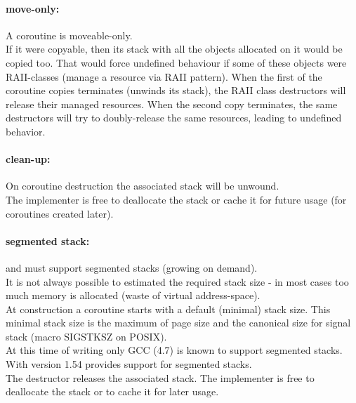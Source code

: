 \paragraph*{move-only:}
A coroutine is moveable-only.\\
\newline
If it were copyable, then its stack with all the objects allocated on it
would be copied too. That would force undefined behaviour if some of these objects
were RAII-classes (manage a resource via RAII pattern). When the first of the
coroutine copies terminates (unwinds its stack), the RAII class destructors will
release their managed resources. When the second copy terminates, the same
destructors will try to doubly-release the same resources, leading to undefined
behavior.

\paragraph*{clean-up:}
On coroutine destruction the associated stack will be unwound.\\
\newline
The implementer is free to deallocate the stack or cache it for future usage
(for coroutines created later).

\paragraph*{segmented stack:}
\acoro and \scoro must support segmented stacks (growing on demand).\\
\newline
It is not always possible to estimated the required stack size - in most cases
too much memory is allocated (waste of virtual address-space).\\
At construction a coroutine starts with a default (minimal) stack size. This
minimal stack size is the maximum of page size and the canonical size for signal
stack (macro SIGSTKSZ on POSIX).\\
At this time of writing only GCC (4.7)\cite{gccsplit} is known to support
segmented stacks. With version 1.54 \boostcoroutine provides support for
segmented stacks.\\
The destructor releases the associated stack. The implementer is free to
deallocate the stack or to cache it for later usage.

